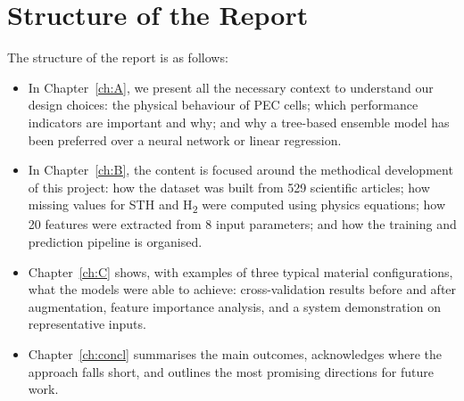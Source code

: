 \section{Structure of the Report}

The structure of the report is as follows:

\begin{itemize}
  \item In Chapter~\ref{ch:A}, we present all the necessary context to understand
        our design choices: the physical behaviour of PEC cells; which performance
        indicators are important and why; and why a tree-based ensemble model has
        been preferred over a neural network or linear regression.

  \item In Chapter~\ref{ch:B}, the content is focused around the methodical
        development of this project: how the dataset was built from 529 scientific
        articles; how missing values for STH and H\textsubscript{2} were computed
        using physics equations; how 20 features were extracted from 8 input
        parameters; and how the training and prediction pipeline is organised.

  \item Chapter~\ref{ch:C} shows, with examples of three typical material
        configurations, what the models were able to achieve: cross-validation
        results before and after augmentation, feature importance analysis,
        and a system demonstration on representative inputs.

  \item Chapter~\ref{ch:concl} summarises the main outcomes, acknowledges
        where the approach falls short, and outlines the most promising
        directions for future work.
\end{itemize}
